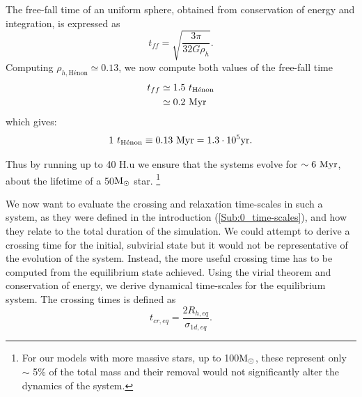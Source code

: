  The free-fall time of an uniform sphere, obtained from conservation of energy and integration, is expressed as
\begin{equation}
t_{ff} = \sqrt{\frac{3\pi}{32 G \rho_{h	}}}.
\end{equation}
Computing $\rho_{h,\textrm{H\'enon}} \simeq 0.13$, we now compute both values of the free-fall time
\begin{align}
t_{ff} &\simeq 1.5~ t_{\textrm{H\'enon}}\\
	   &\simeq 0.2~ {\textrm{Myr}}
\end{align}
which gives: 
\begin{equation}
1 ~ t_{\textrm{H\'enon}} \equiv 0.13~ {\textrm{Myr}} = 1.3 \cdot 10^5 {\textrm{yr}} .
\end{equation}


Thus by running up to 40 H.u we ensure that the systems evolve for $ \sim  6~{\textrm{Myr}} $, about the lifetime of a 50${\textrm{M}_\odot}$ star. \footnote{For our models with more massive stars, up to 100${\textrm{M}_\odot}$, these represent only $\sim$ 5\% of the total mass and their removal would not significantly alter the dynamics of the system.}

We now want to evaluate the crossing and relaxation time-scales in such a system, as they were defined in the introduction (\ref{Sub:0_time-scales}), and how they relate to the total duration of the simulation. We could attempt to derive a crossing time for the initial, subvirial state but it would not be representative of the evolution of the system. Instead, the more useful crossing time has to be computed from the equilibrium state achieved. Using the virial theorem and conservation of energy, we derive dynamical time-scales for the equilibrium system. The crossing times is defined as
\begin{equation}
\label{Eq:3_tcr}
t_{cr,eq} = \frac{2 R_{h,eq}}{\sigma_{1d,eq}}.
\end{equation}

